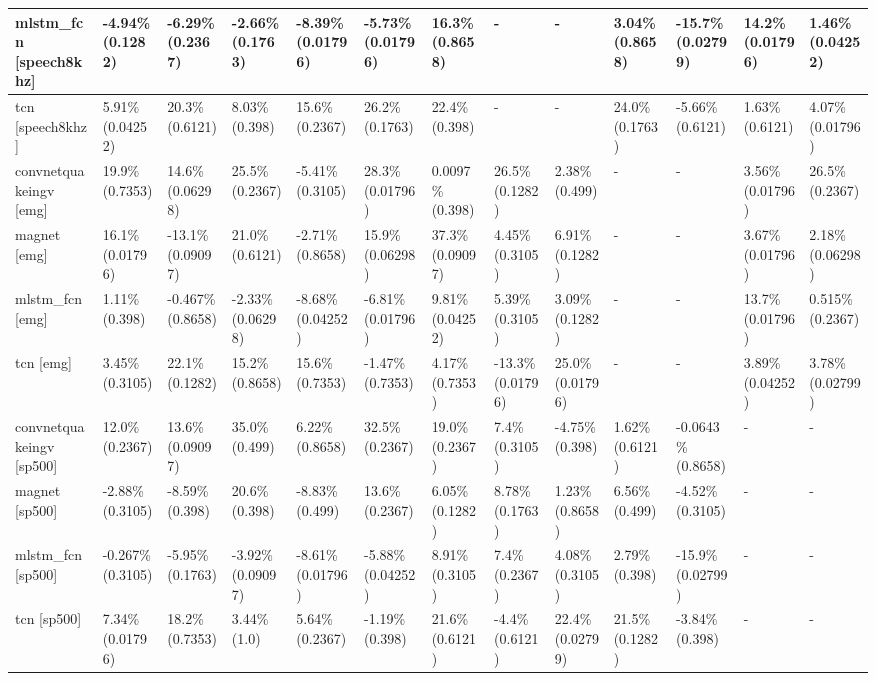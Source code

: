 \begin{table}[]
\begin{adjustwidth}{-1in}{-1in}
\begin{tabular}{|l|l|l|l|l|l|l|l|l|l|l|l|l|}
mlstm\_fcn [speech8khz] & -4.94\%  (0.1282) & -6.29\%  (0.2367) & -2.66\%  (0.1763) & \cellcolor{red} -8.39\% (0.01796) & \cellcolor{red} -5.73\% (0.01796) & 16.3\%  (0.8658) & - & - & 3.04\%  (0.8658) & \cellcolor{red} -15.7\% (0.02799) & \cellcolor{green} 14.2\% (0.01796) & \cellcolor{green} 1.46\% (0.04252) \\ \hline
tcn [speech8khz] & \cellcolor{green} 5.91\% (0.04252) & 20.3\%  (0.6121) & 8.03\%  (0.398) & 15.6\%  (0.2367) & 26.2\%  (0.1763) & 22.4\%  (0.398) & - & - & 24.0\%  (0.1763) & -5.66\%  (0.6121) & 1.63\%  (0.6121) & \cellcolor{green} 4.07\% (0.01796) \\ \hline
convnetquakeingv [emg] & 19.9\%  (0.7353) & 14.6\%  (0.06298) & 25.5\%  (0.2367) & -5.41\%  (0.3105) & \cellcolor{green} 28.3\% (0.01796) & 0.0097\%  (0.398) & 26.5\%  (0.1282) & 2.38\%  (0.499) & - & - & \cellcolor{green} 3.56\% (0.01796) & 26.5\%  (0.2367) \\ \hline
magnet [emg] & \cellcolor{green} 16.1\% (0.01796) & -13.1\%  (0.09097) & 21.0\%  (0.6121) & -2.71\%  (0.8658) & 15.9\%  (0.06298) & 37.3\%  (0.09097) & 4.45\%  (0.3105) & 6.91\%  (0.1282) & - & - & \cellcolor{green} 3.67\% (0.01796) & 2.18\%  (0.06298) \\ \hline
mlstm\_fcn [emg] & 1.11\%  (0.398) & -0.467\%  (0.8658) & -2.33\%  (0.06298) & \cellcolor{red} -8.68\% (0.04252) & \cellcolor{red} -6.81\% (0.01796) & \cellcolor{green} 9.81\% (0.04252) & 5.39\%  (0.3105) & 3.09\%  (0.1282) & - & - & \cellcolor{green} 13.7\% (0.01796) & 0.515\%  (0.2367) \\ \hline
tcn [emg] & 3.45\%  (0.3105) & 22.1\%  (0.1282) & 15.2\%  (0.8658) & 15.6\%  (0.7353) & -1.47\%  (0.7353) & 4.17\%  (0.7353) & \cellcolor{red} -13.3\% (0.01796) & \cellcolor{green} 25.0\% (0.01796) & - & - & \cellcolor{green} 3.89\% (0.04252) & \cellcolor{green} 3.78\% (0.02799) \\ \hline
convnetquakeingv [sp500] & 12.0\%  (0.2367) & 13.6\%  (0.09097) & 35.0\%  (0.499) & 6.22\%  (0.8658) & 32.5\%  (0.2367) & 19.0\%  (0.2367) & 7.4\%  (0.3105) & -4.75\%  (0.398) & 1.62\%  (0.6121) & -0.0643\%  (0.8658) & - & - \\ \hline
magnet [sp500] & -2.88\%  (0.3105) & -8.59\%  (0.398) & 20.6\%  (0.398) & -8.83\%  (0.499) & 13.6\%  (0.2367) & 6.05\%  (0.1282) & 8.78\%  (0.1763) & 1.23\%  (0.8658) & 6.56\%  (0.499) & -4.52\%  (0.3105) & - & - \\ \hline
mlstm\_fcn [sp500] & -0.267\%  (0.3105) & -5.95\%  (0.1763) & -3.92\%  (0.09097) & \cellcolor{red} -8.61\% (0.01796) & \cellcolor{red} -5.88\% (0.04252) & 8.91\%  (0.3105) & 7.4\%  (0.2367) & 4.08\%  (0.3105) & 2.79\%  (0.398) & \cellcolor{red} -15.9\% (0.02799) & - & - \\ \hline
tcn [sp500] & \cellcolor{green} 7.34\% (0.01796) & 18.2\%  (0.7353) & 3.44\%  (1.0) & 5.64\%  (0.2367) & -1.19\%  (0.398) & 21.6\%  (0.6121) & -4.4\%  (0.6121) & \cellcolor{green} 22.4\% (0.02799) & 21.5\%  (0.1282) & -3.84\%  (0.398) & - & - \\ \hline
\end{tabular}
\end{adjustwidth}
\end{table}
